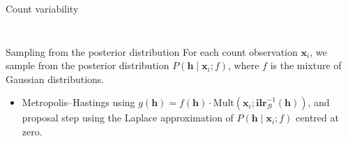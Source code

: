 \documentclass[9pt]{beamer}
\begin{document}
\begin{frame}[t]{Count variability}
\begin{columns}
\begin{column}{0.5\textwidth}
\begin{figure}
%
\end{figure}
\end{column}
\end{columns}

\vspace{-0.2cm}
\begin{exampleblock}{Sampling from the posterior distribution}
For each count observation $\textbf{x}_i$, we sample from the posterior distribution $P(\textbf{h} \mid \textbf{x}_i; f)$, where $f$ is the mixture of Gaussian distributions.
\begin{itemize}
\item Metropolis–Hastings using $g(\textbf{h}) = f(\textbf{h})\cdot\text{Mult}(\textbf{x}_i; \textbf{ilr}_\mathcal{B}^{-1}(\textbf{h}))$, and proposal step using the Laplace approximation of $P(\textbf{h} \mid \textbf{x}_i; f)$ centred at zero.
\end{itemize}
\end{exampleblock}


\end{frame}
\end{document}
